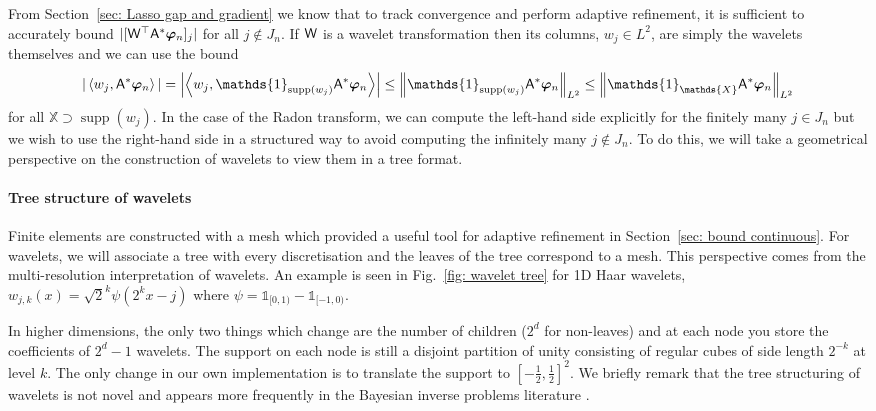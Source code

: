 \documentclass[smallextended]{svjour3}
\let\F\mathds\let\C\mathcal\newcommand{\R}{\F{R}}\newcommand{\A}{\tens{A}}
\newcommand{\norm}[1]{{\left\lVert #1 \right\rVert}}
\newcommand{\IP}[2]{\left\langle #1,#2 \right\rangle}
\newcommand{\1}{\F{1}}
\DeclareMathOperator{\supp}{supp}
\begin{document}
	From Section~\ref{sec: Lasso gap and gradient} we know that to track convergence and perform adaptive refinement, it is sufficient to accurately bound $|[\tens{W}^\top \A^*\vec{\varphi}_n]_j|$ for all $j\notin J_n$. If $\mathsf{W}$ is a wavelet transformation then its columns, $w_j\in L^2$, are simply the wavelets themselves and we can use the bound 
	\begin{equation}
		|\IP{w_j}{\A^*\vec{\varphi}_n}| = \left|\IP{w_j}{\1_{\supp(w_j)}\A^*\vec{\varphi}_n}\right| \leq \norm{\1_{\supp(w_j)} \A^*\vec{\varphi}_n}_{L^2}\leq \norm{\1_{\F{X}} \A^*\vec{\varphi}_n}_{L^2}
	\end{equation}
	for all $\F{X}\supset \supp(w_j)$.
	In the case of the Radon transform, we can compute the left-hand side explicitly for the finitely many $j\in J_n$ but we wish to use the right-hand side in a structured way to avoid computing the infinitely many $j\notin J_n$. To do this, we will take a geometrical perspective on the construction of wavelets to view them in a tree format. 
	
	\paragraph{Tree structure of wavelets}
	Finite elements are constructed with a mesh which provided a useful tool for adaptive refinement in Section~\ref{sec: bound continuous}. For wavelets, we will associate a tree with every discretisation and the leaves of the tree correspond to a mesh. This perspective comes from the multi-resolution interpretation of wavelets. An example is seen in Fig.~\ref{fig: wavelet tree} for 1D Haar wavelets, $w_{j,k}(x) = \sqrt{2}^k\psi(2^{k}x-j)$ where $\psi = \1_{[0,1)} - \1_{[-1,0)}$. 
	
	In higher dimensions, the only two things which change are the number of children ($2^d$ for non-leaves) and at each node you store the coefficients of $2^d-1$ wavelets. The support on each node is still a disjoint partition of unity consisting of regular cubes of side length $2^{-k}$ at level $k$. The only change in our own implementation is to translate the support to $[-\tfrac12,\tfrac12]^2$. We briefly remark that the tree structuring of wavelets is not novel and appears more frequently in the Bayesian inverse problems literature \cite{Castillo2019,Kekkonen2021}.
	
\end{document}
